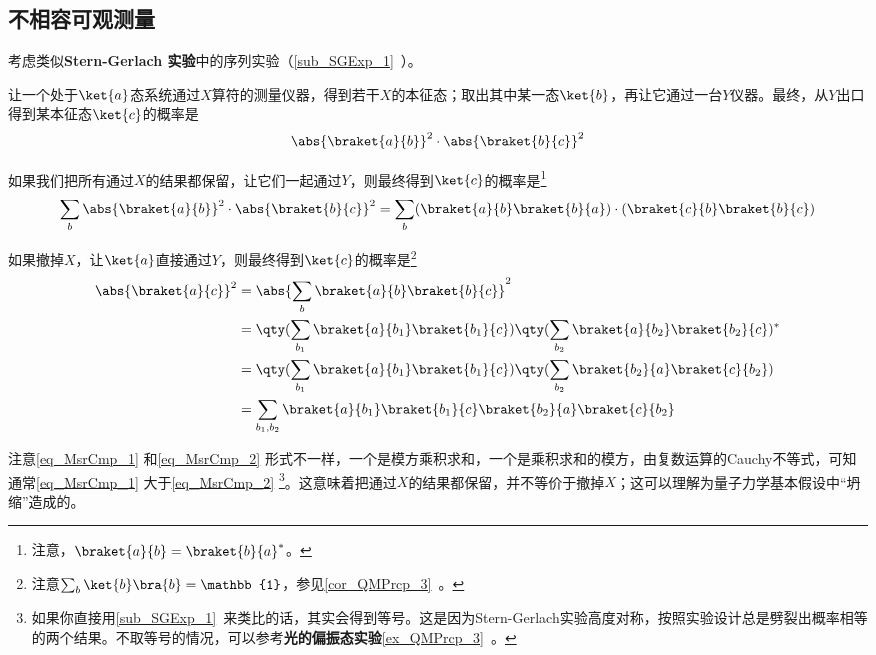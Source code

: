 \subsection{不相容可观测量}


考虑类似\textbf{Stern-Gerlach 实验}中的序列实验（\autoref{sub_SGExp_1}~）。

让一个处于$\ket{a}$态系统通过$X$算符的测量仪器，得到若干$X$的本征态；取出其中某一态$\ket{b}$，再让它通过一台$Y$仪器。最终，从$Y$出口得到某本征态$\ket{c}$的概率是
\begin{equation}
\abs{\braket{a}{b}}^2\cdot\abs{\braket{b}{c}}^2
\end{equation}

如果我们把所有通过$X$的结果都保留，让它们一起通过$Y$，则最终得到$\ket{c}$的概率是\footnote{注意，$\braket{a}{b}=\braket{b}{a}^*$。}
\begin{equation}\label{eq_MsrCmp_1}
\sum_{b}\abs{\braket{a}{b}}^2\cdot\abs{\braket{b}{c}}^2=\sum_{b}(\braket{a}{b}\braket{b}{a})\cdot(\braket{c}{b}\braket{b}{c})
\end{equation}

如果撤掉$X$，让$\ket{a}$直接通过$Y$，则最终得到$\ket{c}$的概率是\footnote{注意$\sum_{b}\ket{b}\bra{b}=\mathbb{1}$，参见\autoref{cor_QMPrcp_3}~。}
\begin{equation}\label{eq_MsrCmp_2}
\begin{aligned}
\abs{\braket{a}{c}}^2&=\abs{\sum_{b}\braket{a}{b}\braket{b}{c}}^2\\
&=\qty(\sum_{b_1}\braket{a}{b_1}\braket{b_1}{c})\qty(\sum_{b_2}\braket{a}{b_2}\braket{b_2}{c})^*\\
&=\qty(\sum_{b_1}\braket{a}{b_1}\braket{b_1}{c})\qty(\sum_{b_2}\braket{b_2}{a}\braket{c}{b_2})\\
&=\sum_{b_1, b_2}\braket{a}{b_1}\braket{b_1}{c}\braket{b_2}{a}\braket{c}{b_2}
\end{aligned}
\end{equation}

注意\autoref{eq_MsrCmp_1} 和\autoref{eq_MsrCmp_2} 形式不一样，一个是模方乘积求和，一个是乘积求和的模方，由复数运算的Cauchy不等式，可知通常\autoref{eq_MsrCmp_1} 大于\autoref{eq_MsrCmp_2} \footnote{如果你直接用\autoref{sub_SGExp_1}~来类比的话，其实会得到等号。这是因为Stern-Gerlach实验高度对称，按照实验设计总是劈裂出概率相等的两个结果。不取等号的情况，可以参考\textbf{光的偏振态实验}\autoref{ex_QMPrcp_3}~。}。这意味着把通过$X$的结果都保留，并不等价于撤掉$X$；这可以理解为量子力学基本假设中“坍缩”造成的。

